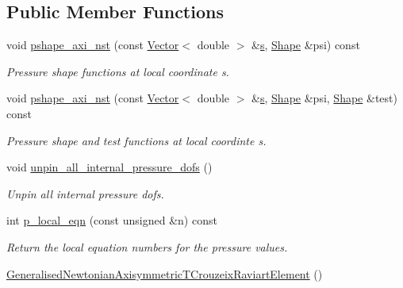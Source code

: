 \subsection*{Public Member Functions}
\begin{DoxyCompactItemize}
\item 
void \hyperlink{classoomph_1_1GeneralisedNewtonianAxisymmetricTCrouzeixRaviartElement_a1b9ec235ffab0005d4f38fe0fc639491}{pshape\+\_\+axi\+\_\+nst} (const \hyperlink{classoomph_1_1Vector}{Vector}$<$ double $>$ \&\hyperlink{cfortran_8h_ab7123126e4885ef647dd9c6e3807a21c}{s}, \hyperlink{classoomph_1_1Shape}{Shape} \&psi) const
\begin{DoxyCompactList}\small\item\em Pressure shape functions at local coordinate s. \end{DoxyCompactList}\item 
void \hyperlink{classoomph_1_1GeneralisedNewtonianAxisymmetricTCrouzeixRaviartElement_a5b3ab448ee65204076afc4009bd53f59}{pshape\+\_\+axi\+\_\+nst} (const \hyperlink{classoomph_1_1Vector}{Vector}$<$ double $>$ \&\hyperlink{cfortran_8h_ab7123126e4885ef647dd9c6e3807a21c}{s}, \hyperlink{classoomph_1_1Shape}{Shape} \&psi, \hyperlink{classoomph_1_1Shape}{Shape} \&test) const
\begin{DoxyCompactList}\small\item\em Pressure shape and test functions at local coordinte s. \end{DoxyCompactList}\item 
void \hyperlink{classoomph_1_1GeneralisedNewtonianAxisymmetricTCrouzeixRaviartElement_a220610a8dc1c6170888ebf3a684f3fea}{unpin\+\_\+all\+\_\+internal\+\_\+pressure\+\_\+dofs} ()
\begin{DoxyCompactList}\small\item\em Unpin all internal pressure dofs. \end{DoxyCompactList}\item 
int \hyperlink{classoomph_1_1GeneralisedNewtonianAxisymmetricTCrouzeixRaviartElement_a15be96962f316650fdcec3b48345f0b7}{p\+\_\+local\+\_\+eqn} (const unsigned \&n) const
\begin{DoxyCompactList}\small\item\em Return the local equation numbers for the pressure values. \end{DoxyCompactList}\item 
\hyperlink{classoomph_1_1GeneralisedNewtonianAxisymmetricTCrouzeixRaviartElement_ad3cdf462e6c77d0c1b705908e26586f1}{Generalised\+Newtonian\+Axisymmetric\+T\+Crouzeix\+Raviart\+Element} ()

\end{DoxyCompactItemize}
